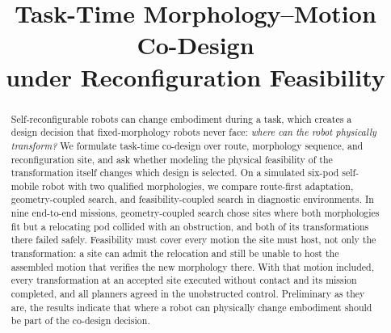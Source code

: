 \documentclass[conference]{IEEEtran}
\begin{document}
\title{Task-Time Morphology--Motion Co-Design\\under Reconfiguration Feasibility}

\author{
}

\maketitle

\begin{abstract}
Self-reconfigurable robots can change embodiment during a task, which creates a design decision that fixed-morphology robots never face: \emph{where can the robot physically transform?} We formulate task-time co-design over route, morphology sequence, and reconfiguration site, and ask whether modeling the physical feasibility of the transformation itself changes which design is selected. On a simulated six-pod self-mobile robot with two qualified morphologies, we compare route-first adaptation, geometry-coupled search, and feasibility-coupled search in diagnostic environments. In nine end-to-end missions, geometry-coupled search chose sites where both morphologies fit but a relocating pod collided with an obstruction, and both of its transformations there failed safely. Feasibility must cover every motion the site must host, not only the transformation: a site can admit the relocation and still be unable to host the assembled motion that verifies the new morphology there. With that motion included, every transformation at an accepted site executed without contact and its mission completed, and all planners agreed in the unobstructed control. Preliminary as they are, the results indicate that where a robot can physically change embodiment should be part of the co-design decision.
\end{abstract}
\end{document}
